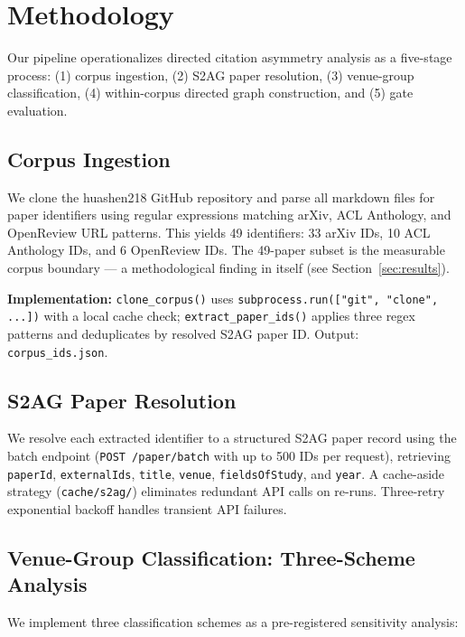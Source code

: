 \section{Methodology}
\label{sec:method}

Our pipeline operationalizes directed citation asymmetry analysis as a five-stage process: (1) corpus ingestion, (2) S2AG paper resolution, (3) venue-group classification, (4) within-corpus directed graph construction, and (5) gate evaluation.

\subsection{Corpus Ingestion}

We clone the huashen218 GitHub repository and parse all markdown files for paper identifiers using regular expressions matching arXiv, ACL Anthology, and OpenReview URL patterns.
This yields 49 identifiers: 33 arXiv IDs, 10 ACL Anthology IDs, and 6 OpenReview IDs.
The 49-paper subset is the measurable corpus boundary --- a methodological finding in itself (see Section~\ref{sec:results}).

\textbf{Implementation:} \texttt{clone\_corpus()} uses \texttt{subprocess.run(["git", "clone", ...])} with a local cache check; \texttt{extract\_paper\_ids()} applies three regex patterns and deduplicates by resolved S2AG paper ID. Output: \texttt{corpus\_ids.json}.

\subsection{S2AG Paper Resolution}

We resolve each extracted identifier to a structured S2AG paper record using the batch endpoint (\texttt{POST /paper/batch} with up to 500 IDs per request), retrieving \texttt{paperId}, \texttt{externalIds}, \texttt{title}, \texttt{venue}, \texttt{fieldsOfStudy}, and \texttt{year}.
A cache-aside strategy (\texttt{cache/s2ag/}) eliminates redundant API calls on re-runs.
Three-retry exponential backoff handles transient API failures.

\subsection{Venue-Group Classification: Three-Scheme Analysis}

We implement three classification schemes as a pre-registered sensitivity analysis:

